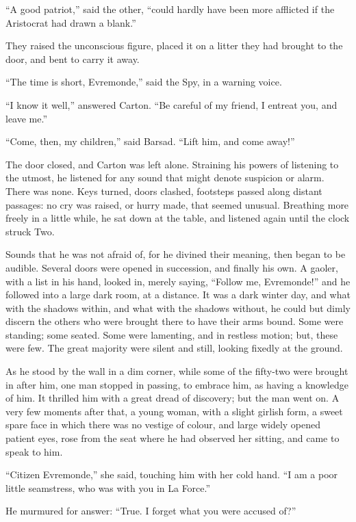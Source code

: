 ``A good patriot,'' said the other, ``could hardly have been more
afflicted if the Aristocrat had drawn a blank.''

They raised the unconscious figure, placed it on a litter they had
brought to the door, and bent to carry it away.

``The time is short, Evremonde,'' said the Spy, in a warning voice.

``I know it well,'' answered Carton.  ``Be careful of my friend, I
entreat you, and leave me.''

``Come, then, my children,'' said Barsad.  ``Lift him, and come away!''

The door closed, and Carton was left alone.  Straining his powers of
listening to the utmost, he listened for any sound that might denote
suspicion or alarm.  There was none.  Keys turned, doors clashed,
footsteps passed along distant passages:  no cry was raised, or hurry
made, that seemed unusual.  Breathing more freely in a little while,
he sat down at the table, and listened again until the clock struck Two.

Sounds that he was not afraid of, for he divined their meaning, then
began to be audible.  Several doors were opened in succession, and
finally his own.  A gaoler, with a list in his hand, looked in,
merely saying, ``Follow me, Evremonde!'' and he followed into a large
dark room, at a distance.  It was a dark winter day, and what with
the shadows within, and what with the shadows without, he could but
dimly discern the others who were brought there to have their arms
bound.  Some were standing; some seated.  Some were lamenting, and in
restless motion; but, these were few. The great majority were silent
and still, looking fixedly at the ground.

As he stood by the wall in a dim corner, while some of the fifty-two
were brought in after him, one man stopped in passing, to embrace
him, as having a knowledge of him.  It thrilled him with a great
dread of discovery; but the man went on.  A very few moments after
that, a young woman, with a slight girlish form, a sweet spare face
in which there was no vestige of colour, and large widely opened
patient eyes, rose from the seat where he had observed her sitting,
and came to speak to him.

``Citizen Evremonde,'' she said, touching him with her cold hand.
``I am a poor little seamstress, who was with you in La Force.''

He murmured for answer:  ``True.  I forget what you were accused of?''

